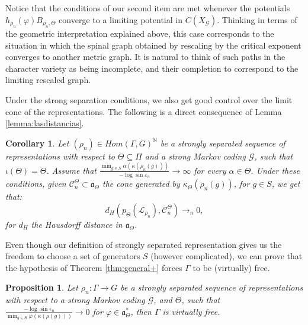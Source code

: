\documentclass{amsart}
\newtheorem{prop}[thm]{Proposition}
\newtheorem{coro}[thm]{Corollary}
\theoremstyle{remark}
\theoremstyle{definition}
\begin{document}
Notice that the conditions of our second item are met whenever the potentials $h_{\rho_n} (\varphi) B_{\rho_n,\Theta}$ converge to a limiting potential in $C(X_\mathcal{G})$.
Thinking in terms of the geometric interpretation explained above, this case corresponds to the situation in which the spinal graph obtained by rescaling by the critical exponent converges to another metric graph.
It is natural to think of such paths in the character variety as being incomplete, and their completion to correspond to the limiting rescaled graph.

Under the strong separation conditions, we also get good control over the limit cone of the representations.
The following is a direct consequence of Lemma \ref{lemma:lasdistancias}.

\begin{coro}
\label{coro:limitcones}
Let $(\rho_n) \in Hom (\Gamma, G)^\mathbb{N}$ be a strongly separated sequence of representations with respect to $\Theta \subseteq \Pi$ and a strong Markov coding $\mathcal{G}$, such that $\iota(\Theta) = \Theta$. Assume that $\frac{\min_{g \in S} \alpha (\kappa (\rho_n(g)))}{-\log \sin \varepsilon_n} \to \infty$ for every $\alpha \in \Theta$.
Under these conditions, given $\mathcal{C}^\Theta_n \subset \mathfrak{a}_\Theta$ the cone generated by $\kappa_\Theta (\rho_n (g))$, for $g \in S$, we get that:
$$d_{H} (p_\Theta (\mathcal{L}_{\rho_n}), \mathcal{C}^\Theta_n) \to_n 0,$$
for $d_{H}$ the Hausdorff distance in $\mathfrak{a}_\Theta$.
\end{coro}


Even though our definition of strongly separated representation gives us the freedom to choose a set of generators $S$ (however complicated), we can prove that the hypothesis of Theorem \ref{thm:general+} forces $\Gamma$ to be (virtually) free.

\begin{prop}
\label{prop:onlyfree}
 Let $\rho_n : \Gamma \rightarrow G$ be a strongly separated sequence of representations with respect to a strong Markov coding $\mathcal{G}$, and $\Theta$, such that $ \frac{-\log\sin\epsilon_n}{\min_{g \in S} \varphi (\kappa (\rho(g)))} \to 0$ for $\varphi \in \mathfrak{a}_\Theta^*$, then $\Gamma$ is virtually free.
\end{prop}
\end{document}
